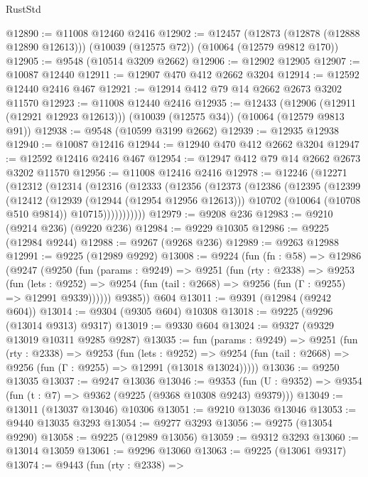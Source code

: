 \begin{lexlean}{RustStd}
\begin{coremodule}
@12890 := @11008 @12460 @2416
@12902 := @12457
    (@12873 (@12878 (@12888 @12890 @12613)))
    (@10039 (@12575 @72))
    (@10064 (@12579 @9812 @170))
@12905 := @9548 (@10514 @3209 @2662)
@12906 := @12902 @12905
@12907 := @10087 @12440
@12911 := @12907 @470 @412 @2662 @3204
@12914 := @12592 @12440 @2416 @467
@12921 := @12914 @412 @79 @14 @2662 @2673 @3202 @11570
@12923 := @11008 @12440 @2416
@12935 := @12433
    (@12906 (@12911 (@12921 @12923 @12613)))
    (@10039 (@12575 @34))
    (@10064 (@12579 @9813 @91))
@12938 := @9548 (@10599 @3199 @2662)
@12939 := @12935 @12938
@12940 := @10087 @12416
@12944 := @12940 @470 @412 @2662 @3204
@12947 := @12592 @12416 @2416 @467
@12954 := @12947 @412 @79 @14 @2662 @2673 @3202 @11570
@12956 := @11008 @12416 @2416
@12978 := @12246
    (@12271
      (@12312
        (@12314
          (@12316
            (@12333
              (@12356
                (@12373
                  (@12386
                    (@12395
                      (@12399
                        (@12412
                          (@12939 (@12944 (@12954 @12956 @12613)))
                          @10702
                          (@10064 (@10708 @510 @9814))
                          @10715)))))))))))
@12979 := @9208 @236
@12983 := @9210 (@9214 @236) (@9220 @236)
@12984 := @9229 @10305
@12986 := @9225 (@12984 @9244)
@12988 := @9267 (@9268 @236)
@12989 := @9263 @12988
@12991 := @9225 (@12989 @9292)
@13008 := @9224
    (fun (fn : @58) =>
    @12986
      (@9247
        (@9250
          (fun (params : @9249) =>
          @9251
            (fun (rty : @2338) =>
            @9253
              (fun (lets : @9252) =>
              @9254 (fun (tail : @2668) => @9256 (fun (Γ : @9255) => @12991 @9339))))))
        @9385))
    @604
@13011 := @9391 (@12984 (@9242 @604))
@13014 := @9304 (@9305 @604) @10308
@13018 := @9225 (@9296 (@13014 @9313) @9317)
@13019 := @9330 @604
@13024 := @9327 (@9329 @13019 @10311 @9285 @9287)
@13035 := fun (params : @9249) =>
  @9251
    (fun (rty : @2338) =>
    @9253
      (fun (lets : @9252) =>
      @9254 (fun (tail : @2668) => @9256 (fun (Γ : @9255) => @12991 (@13018 @13024)))))
@13036 := @9250 @13035
@13037 := @9247 @13036
@13046 := @9353
    (fun (U : @9352) => @9354 (fun (t : @7) => @9362 (@9225 (@9368 @10308 @9243) @9379)))
@13049 := @13011 (@13037 @13046) @10306
@13051 := @9210 @13036 @13046
@13053 := @9440 @13035 @3293
@13054 := @9277 @3293
@13056 := @9275 (@13054 @9290)
@13058 := @9225 (@12989 @13056)
@13059 := @9312 @3293
@13060 := @13014 @13059
@13061 := @9296 @13060
@13063 := @9225 (@13061 @9317)
@13074 := @9443
    (fun (rty : @2338) =>

\end{coremodule}
\end{lexlean}
